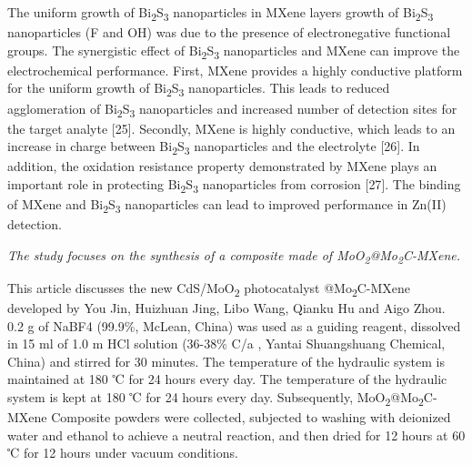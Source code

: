 \begin{multicols}{2}
The uniform growth of Bi\textsubscript{2}S\textsubscript{3}
nanoparticles in MXene layers growth of
Bi\textsubscript{2}S\textsubscript{3} nanoparticles (F and OH) was
due to the presence of electronegative functional groups. The
synergistic effect of Bi\textsubscript{2}S\textsubscript{3}
nanoparticles and MXene can improve the electrochemical
performance. First, MXene provides a highly conductive platform
for the uniform growth of Bi\textsubscript{2}S\textsubscript{3}
nanoparticles. This leads to reduced agglomeration of
Bi\textsubscript{2}S\textsubscript{3} nanoparticles and increased
number of detection sites for the target analyte {[}25{]}.
Secondly, MXene is highly conductive, which leads to an increase
in charge between Bi\textsubscript{2}S\textsubscript{3}
nanoparticles and the electrolyte {[}26{]}. In addition, the
oxidation resistance property demonstrated by MXene plays an
important role in protecting Bi\textsubscript{2}S\textsubscript{3}
nanoparticles from corrosion {[}27{]}. The binding of MXene and
Bi\textsubscript{2}S\textsubscript{3} nanoparticles can lead to
improved performance in Zn(II) detection.

\emph{The study focuses on the synthesis of a composite made of
MoO\textsubscript{2}@Mo\textsubscript{2}C-MXene.}

This article discusses the new CdS/MoO\textsubscript{2}
photocatalyst @Mo\textsubscript{2}C-MXene developed by You Jin,
Huizhuan Jing, Libo Wang, Qianku Hu and Aigo Zhou. 0.2 g of
NaBF4 (99.9\%, McLean, China) was used as a guiding reagent,
dissolved in 15 ml of 1.0 m HCl solution (36-38\% C/a , Yantai
Shuangshuang Chemical, China) and stirred for 30 minutes. The
temperature of the hydraulic system is maintained at 180 ℃ for
24 hours every day. The temperature of the hydraulic system is
kept at 180 ℃ for 24 hours every day. Subsequently,
MoO\textsubscript{2}@Mo\textsubscript{2}C-MXene Composite powders
were collected, subjected to washing with deionized water and
ethanol to achieve a neutral reaction, and then dried for 12
hours at 60 ℃ for 12 hours under vacuum conditions.


\end{multicols}
